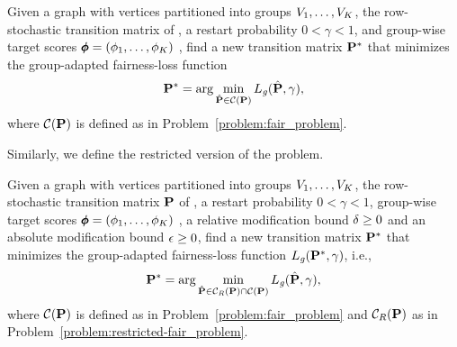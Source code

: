 \documentclass[sigconf, anonymous, review]{acmart}
\begin{document}
\begin{problem}[\gaphiPageRank]
\label{problem:cross-fair-loss}
Given a graph \graph with vertices partitioned into groups $V_1, \ldots, V_K$, the row-stochastic transition matrix \transmatrix of \graph, a restart probability $0 < \gamma < 1$, and group-wise target \pagerank scores $\pmb{\phi} = (\phi_1, \ldots, \phi_K)$ , find a new transition matrix $\mathbf{{P}}^{*}$ that minimizes the group-adapted fairness-loss function
\begin{equation}
    \mathbf{{P}}^{*} = \arg\min_{\hat{\mathbf{{P}}} \in \mathcal{C}(\mathbf{{P}})} 
    L_{\mathit{g}}(\hat{\mathbf{{P}}}, \gamma),
\end{equation}
where $\mathcal{C}(\mathbf{{P}})$ is defined as in Problem~\ref{problem:fair_problem}.
\end{problem}

Similarly, we define the restricted 
version of the problem.

\begin{problem}[\resgaphiPageRank]
\label{problem:cross-restricted-fair-loss}
Given a graph \graph with vertices partitioned into groups $V_1, \ldots, V_K$, the row-stochastic transition matrix $\mathbf{{P}}$ of \graph, a restart probability $0 < \gamma < 1$, group-wise target \pagerank scores $\pmb{\phi} = (\phi_1, \ldots, \phi_K)$ , a relative modification bound $\delta \ge 0$ and an absolute modification bound $\epsilon \ge 0$, find a new transition matrix $\mathbf{{P}}^{*}$ that minimizes the group-adapted fairness-loss function $L_{\mathit{g}}(\mathbf{{P}}^{*}, \gamma)$, i.e.,
\begin{equation*}
    \mathbf{{P}}^{*} = \arg\min_{\hat{\mathbf{{P}}} \in \mathcal{C}_R(\mathbf{{P}}) \cap \mathcal{C}(\mathbf{{P}})} 
                         L_{\mathit{g}}(\hat{\mathbf{{P}}}, \gamma),
\end{equation*}
where $\mathcal{C}(\mathbf{{P}})$ is defined as in Problem~\ref{problem:fair_problem}
and $\mathcal{C}_R(\mathbf{{P}})$ as in Problem~\ref{problem:restricted-fair_problem}.
\end{problem}
\end{document}
